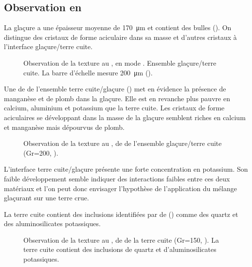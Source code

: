 \subsection{Observation en \MEB[ie]}
La glaçure a une épaisseur moyenne de \SI{170}{\um} et contient 
des bulles (). On distingue des cristaux de 
forme aciculaire dans sa masse et d'autres cristaux à l'interface 
glaçure/terre cuite.

\begin{figure}[htb]
  \caption[\ -- Observation de la texture au \MEB, 
           en mode \ERD. Ensemble glaçure/terre cuite]
          {\legendeC
           Observation de la texture au \MEB, en mode \ERD. 
           Ensemble glaçure/terre cuite. La barre d'échelle mesure 
           \SI{200}{\um} ().}
  \label{MEB:6530_img}
\end{figure}

Une \carto de \RX de l'ensemble terre cuite/glaçure () met en évidence la présence de manganèse et de plomb dans la glaçure. Elle est en revanche plus pauvre en calcium, aluminium et potassium que la terre cuite. Les cristaux de forme aciculaires se développant dans la masse de la glaçure semblent riches en calcium et manganèse mais dépourvus de plomb.

\begin{figure}[htb]
  \caption[\ -- Observation de la texture au \MEB, \carto de \RX de l'ensemble glaçure/terre cuite]
          {\legendeC
           Observation de la texture au \MEB, \carto de \RX de l'ensemble glaçure/terre cuite (Gr=200, ).}
  \label{MEB:6530_carto_tcgla}
\end{figure}

L'interface terre cuite/glaçure présente une forte concentration en 
potassium. Son faible développement semble indiquer des interactions 
faibles entre ces deux matériaux et l'on peut donc envisager 
l'hypothèse de l'application du mélange glaçurant sur une terre crue.

La terre cuite contient des inclusions identifiées par \carto de \RX () comme des quartz et des aluminosilicates potassiques.

\begin{figure}[htb]
  \caption[\ -- Observation de la texture au \MEB, \carto de \RX de la terre cuite]
          {\legendeC
           Observation de la texture au \MEB, \carto de \RX de la terre cuite (Gr=150, ). La terre cuite contient des inclusions de quartz et d'aluminosilicates potassiques.}
  \label{MEB:6530_carto_tc}
\end{figure}


